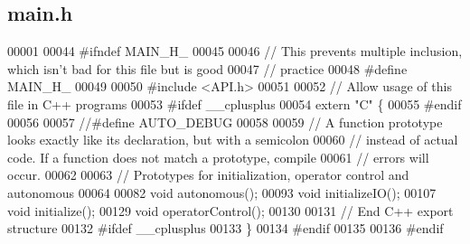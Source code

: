 \subsection{main.\+h}
\label{a00038_source}

\begin{DoxyCode}
00001 
00044 \textcolor{preprocessor}{#ifndef MAIN\_H\_}
00045 
00046 \textcolor{comment}{// This prevents multiple inclusion, which isn't bad for this file but is good}
00047 \textcolor{comment}{// practice}
00048 \textcolor{preprocessor}{#define MAIN\_H\_}
00049 
00050 \textcolor{preprocessor}{#include <API.h>}
00051 
00052 \textcolor{comment}{// Allow usage of this file in C++ programs}
00053 \textcolor{preprocessor}{#ifdef \_\_cplusplus}
00054 \textcolor{keyword}{extern} \textcolor{stringliteral}{"C"} \{
00055 \textcolor{preprocessor}{#endif}
00056 
00057 \textcolor{comment}{//#define AUTO\_DEBUG}
00058 
00059 \textcolor{comment}{// A function prototype looks exactly like its declaration, but with a semicolon}
00060 \textcolor{comment}{// instead of actual code. If a function does not match a prototype, compile}
00061 \textcolor{comment}{// errors will occur.}
00062 
00063 \textcolor{comment}{// Prototypes for initialization, operator control and autonomous}
00064 
00082 \textcolor{keywordtype}{void} autonomous();
00093 \textcolor{keywordtype}{void} initializeIO();
00107 \textcolor{keywordtype}{void} initialize();
00129 \textcolor{keywordtype}{void} operatorControl();
00130 
00131 \textcolor{comment}{// End C++ export structure}
00132 \textcolor{preprocessor}{#ifdef \_\_cplusplus}
00133 \}
00134 \textcolor{preprocessor}{#endif}
00135 
00136 \textcolor{preprocessor}{#endif}
\end{DoxyCode}
